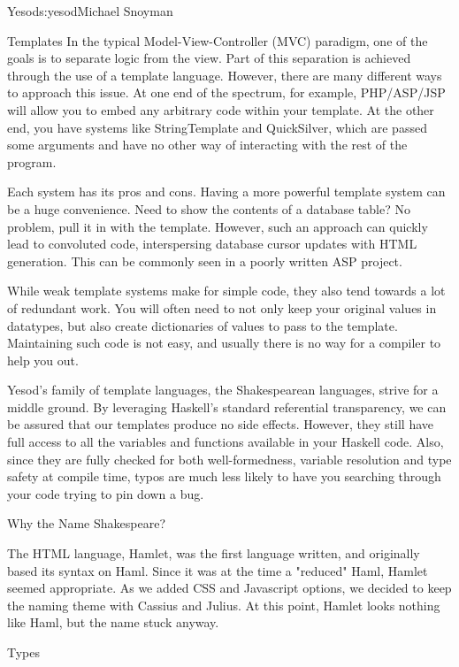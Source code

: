 \begin{aosachapter}{Yesod}{s:yesod}{Michael Snoyman}
\begin{aosasect1}{Templates}
In the typical Model-View-Controller (MVC) paradigm, one of the goals
is to separate logic from the view. Part of this separation is
achieved through the use of a template language. However, there are
many different ways to approach this issue. At one end of the
spectrum, for example, PHP/ASP/JSP will allow you to embed any
arbitrary code within your template. At the other end, you have
systems like StringTemplate and QuickSilver, which are passed some
arguments and have no other way of interacting with the rest of the
program.

Each system has its pros and cons. Having a more powerful template
system can be a huge convenience. Need to show the contents of a
database table? No problem, pull it in with the template. However,
such an approach can quickly lead to convoluted code, interspersing
database cursor updates with HTML generation. This can be commonly
seen in a poorly written ASP project.

While weak template systems make for simple code, they also tend
towards a lot of redundant work. You will often need to not only keep
your original values in datatypes, but also create dictionaries of
values to pass to the template. Maintaining such code is not easy, and
usually there is no way for a compiler to help you out.

Yesod's family of template languages, the Shakespearean languages,
strive for a middle ground. By leveraging Haskell's standard
referential transparency, we can be assured that our templates produce
no side effects. However, they still have full access to all the
variables and functions available in your Haskell code. Also, since
they are fully checked for both well-formedness, variable resolution
and type safety at compile time, typos are much less likely to have
you searching through your code trying to pin down a bug.

\begin{aosabox}{Why the Name Shakespeare?}

The HTML language, Hamlet, was the first language written, and
originally based its syntax on Haml. Since it was at the time a
"reduced" Haml, Hamlet seemed appropriate. As we added CSS and
Javascript options, we decided to keep the naming theme with Cassius
and Julius. At this point, Hamlet looks nothing like Haml, but the
name stuck anyway.

\end{aosabox}

\begin{aosasect2}{Types}


\end{aosasect2}
\end{aosasect1}
\end{aosachapter}
